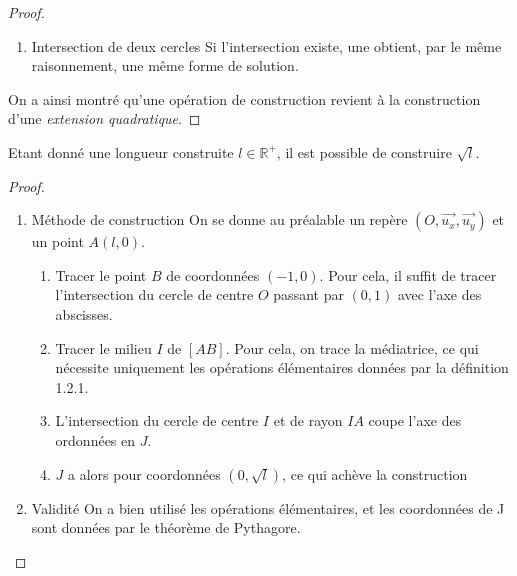 \documentclass[a4paper,12pt,french,draft]{report}
\begin{document}
\begin{proof}
\begin{enumerate}
\[\begin{array}{lllll}
								a = \frac{y_A-y_B}{x_A-x_B}\\
								b = x_A\left(y_B - y_A + \frac{y_B-y_A}{x_A-x_B}\right)+y_A \\
								r = \sqrt{(x_M - x_\Omega)^2 + (y_M - y_\Omega)^2} \\
								y = ax + b \\
								(a^2 + 1)x^2 + 2(a(b-y_B)-x_\Omega)x + {x_\Omega}^2 + (b-y_\Omega)^2 - r^2 = 0
							\end{array}
							\right.
							\]
						Ce qui achève la proof. D'autre part, s'il existe une solution, elle sera bien, pour chaque coordonnée de l'intersection, de la forme \(k + l \sqrt{\delta_0}\), avec \(k, l, \delta_0 \in \mathbb{K}\).
						\item{Intersection de deux cercles} Si l'intersection existe, une obtient, par le même raisonnement, une même forme de solution.
					\end{enumerate}
					On a ainsi montré qu'une opération de construction revient à la construction d'une \emph{extension quadratique}.
				\end{proof}
		
		\begin{proposition}
			Etant donné une longueur construite \(l \in \mathbb{R}^+\), il est possible de construire \(\sqrt{l}\).{}
		\end{proposition}
			\begin{proof}
				\begin{enumerate}
					\item{Méthode de construction}
					On se donne au préalable un repère \( (O, \vec{u_x}, \vec{u_y}) \) et un point \(A(l, 0)\). 
						\begin{enumerate}
							\item Tracer le point \(B\) de coordonnées \((-1, 0)\). Pour cela, il suffit de tracer l'intersection du cercle de centre \(O\) passant par \((0, 1)\) avec l'axe des abscisses.
							\item Tracer le milieu \(I\) de \([AB]\). Pour cela, on trace la médiatrice, ce qui nécessite uniquement les opérations élémentaires données par la définition 1.2.1.
							\item L'intersection du cercle de centre \(I\) et de rayon \(IA\) coupe l'axe des ordonnées en \(J\).
							\item \( J \) a alors pour coordonnées \((0, \sqrt{l})\), ce qui achève la construction
						\end{enumerate}
					\item{Validité} On a bien utilisé les opérations élémentaires, et les coordonnées de J sont données par le théorème de Pythagore.
				\end{enumerate}
			\end{proof}
			
\end{document}
